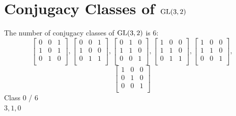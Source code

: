 \section*{Conjugacy Classes of ${\rm GL}(3,2)$}
The number of conjugacy classes of ${\rm GL}(3,2)$ is 6:\\
$$
\left[
\begin{array}{*{3}{r}}
         0 &          0 &          1\\
         1 &          0 &          1\\
         0 &          1 &          0\\
\end{array}
\right]
, 
\left[
\begin{array}{*{3}{r}}
         0 &          0 &          1\\
         1 &          0 &          0\\
         0 &          1 &          1\\
\end{array}
\right]
, 
\left[
\begin{array}{*{3}{r}}
         0 &          1 &          0\\
         1 &          1 &          0\\
         0 &          0 &          1\\
\end{array}
\right]
, 
\left[
\begin{array}{*{3}{r}}
         1 &          0 &          0\\
         1 &          1 &          0\\
         0 &          1 &          1\\
\end{array}
\right]
, 
\left[
\begin{array}{*{3}{r}}
         1 &          0 &          0\\
         1 &          1 &          0\\
         0 &          0 &          1\\
\end{array}
\right]
, 
$$
$$
\left[
\begin{array}{*{3}{r}}
         1 &          0 &          0\\
         0 &          1 &          0\\
         0 &          0 &          1\\
\end{array}
\right]
$$
\bigskip
Class 0 / 6\\
$3,1,0$
